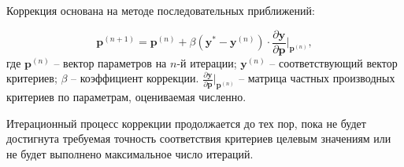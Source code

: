 Коррекция основана на методе последовательных приближений:

\begin{equation}\label{eq:parameters_correction}
	\mathbf{p}^{(n+1)} = \mathbf{p}^{(n)} + \beta (\mathbf{y}^* - \mathbf{y}^{(n)}) \cdot \frac{\partial \mathbf{y}}{\partial \mathbf{p}}|_{\mathbf{p}^{(n)}},
\end{equation}
где $\mathbf{p}^{(n)}$ -- вектор параметров на $n$-й итерации;
$\mathbf{y}^{(n)}$ -- соответствующий вектор критериев;
$\beta$ -- коэффициент коррекции.
$\frac{\partial \mathbf{y}}{\partial \mathbf{p}}|_{\mathbf{p}^{(n)}}$ -- матрица частных производных критериев по параметрам, оцениваемая численно.

Итерационный процесс коррекции продолжается до тех пор, пока не будет достигнута
требуемая точность соответствия критериев целевым значениям или не будет выполнено максимальное число итераций.